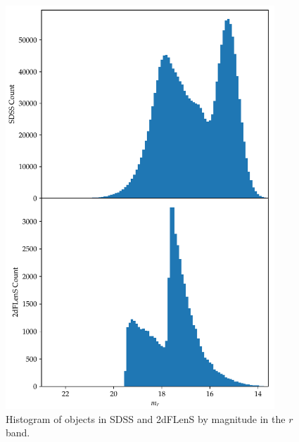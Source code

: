 \documentclass[11pt,twoside,openright]{report}
\begin{document}
  \begin{figure}
    \centering
    \includegraphics[width=0.9\textwidth]{r_hist.pdf}
    \caption{Histogram of objects in SDSS and 2dFLenS by magnitude in the $r$ band.}
    \label{fig:r_hist}
  \end{figure}
\end{document}
